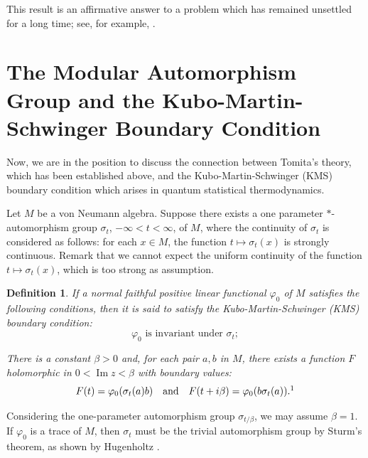 \documentclass[12pt,b5paper,twoside]{article}
\theoremstyle{takesaki}
\newtheorem{definition}{Definition}[section]
\numberwithin{equation}{section}
\begin{document}
This result is an affirmative answer to a problem which has remained
unsettled for a long time; see, for example, \cite[p.~28]{ref3}.

\section{The Modular Automorphism Group and the
Kubo-Martin-Schwinger Boundary Condition}\label{sec:13}

Now, we are in the position to discuss the connection between
Tomita's theory, which has been established above, and the
Kubo-Martin-Schwinger (KMS) boundary condition which arises in quantum
statistical thermodynamics.

Let $M$ be a von Neumann algebra.  Suppose there exists a one
parameter $*$-automorphism group $\sigma_t$, $-\infty<t<\infty$, of
$M$, where the continuity of $\sigma_t$ is considered as follows: for
each $x\in M$, the function $t\mapsto\sigma_t(x)$ is strongly
continuous.  Remark that we cannot expect the uniform continuity of
the function $t\mapsto\sigma_t(x)$, which is too strong as
assumption.

\begin{definition}\label{def:13.1}
If a normal faithful positive linear functional $\varphi_0$ of $M$
satisfies the following conditions, then it is said to satisfy the
Kubo-Martin-Schwinger (KMS) boundary condition:
\begin{equation}
  \varphi_0\text{ is invariant under }\sigma_t;
  \label{eq:13.1}
\end{equation}
\label{eq:13.2}
\noindent
\begin{minipage}[c]{\dimexpr\linewidth-4.2em\relax}
\setlength{\parindent}{0pt}%
There is a constant $\beta>0$ and, for each pair $a,b$ in $M$, there
exists a function $F$ holomorphic in $0<\operatorname{Im}z<\beta$ with
boundary values:
\setlength{\abovedisplayskip}{0pt}%
\setlength{\abovedisplayshortskip}{0pt}%
\[
  F(t)=\varphi_0(\sigma_t(a)b)
  \quad\text{and}\quad
  F(t+i\beta)=\varphi_0(b\sigma_t(a)).\footnotemark
\]
\end{minipage}\hfill
\makebox[3.6em][r]{\normalfont(\theequation)}
\end{definition}

Considering the one-parameter automorphism group $\sigma_{t/\beta}$,
we may assume $\beta=1$.  If $\varphi_0$ is a trace of $M$, then
$\sigma_t$ must be the trivial automorphism group by Sturm's theorem,
as shown by Hugenholtz \cite{ref10}.
\end{document}
